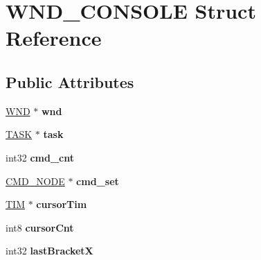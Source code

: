 \hypertarget{struct_w_n_d___c_o_n_s_o_l_e}{}\section{W\+N\+D\+\_\+\+C\+O\+N\+S\+O\+L\+E Struct Reference}
\label{struct_w_n_d___c_o_n_s_o_l_e}
\subsection*{Public Attributes}
\begin{DoxyCompactItemize}
\item 
\hypertarget{struct_w_n_d___c_o_n_s_o_l_e_a480ceb38881ea66056172bc95b153cfb}{}\hyperlink{struct_w_n_d}{W\+N\+D} $\ast$ {\bfseries wnd}\label{struct_w_n_d___c_o_n_s_o_l_e_a480ceb38881ea66056172bc95b153cfb}

\item 
\hypertarget{struct_w_n_d___c_o_n_s_o_l_e_a4b114b647ffdc3efed9cda84cb32c3f5}{}\hyperlink{struct_t_a_s_k}{T\+A\+S\+K} $\ast$ {\bfseries task}\label{struct_w_n_d___c_o_n_s_o_l_e_a4b114b647ffdc3efed9cda84cb32c3f5}

\item 
\hypertarget{struct_w_n_d___c_o_n_s_o_l_e_a544d111ece9d798069d05c1f7db47b51}{}int32 {\bfseries cmd\+\_\+cnt}\label{struct_w_n_d___c_o_n_s_o_l_e_a544d111ece9d798069d05c1f7db47b51}

\item 
\hypertarget{struct_w_n_d___c_o_n_s_o_l_e_a2e3d52b48303c1477242322433a03bbd}{}\hyperlink{struct_c_m_d___n_o_d_e}{C\+M\+D\+\_\+\+N\+O\+D\+E} $\ast$ {\bfseries cmd\+\_\+set}\label{struct_w_n_d___c_o_n_s_o_l_e_a2e3d52b48303c1477242322433a03bbd}

\item 
\hypertarget{struct_w_n_d___c_o_n_s_o_l_e_abcd76ef98471929968c10056d146edf6}{}\hyperlink{struct_t_i_m}{T\+I\+M} $\ast$ {\bfseries cursor\+Tim}\label{struct_w_n_d___c_o_n_s_o_l_e_abcd76ef98471929968c10056d146edf6}

\item 
\hypertarget{struct_w_n_d___c_o_n_s_o_l_e_a15ca8fc665f2f0d2e7b65cfffd96fa94}{}int8 {\bfseries cursor\+Cnt}\label{struct_w_n_d___c_o_n_s_o_l_e_a15ca8fc665f2f0d2e7b65cfffd96fa94}

\item 
\hypertarget{struct_w_n_d___c_o_n_s_o_l_e_ade1998288a28b59299ec67505fbf9872}{}int32 {\bfseries last\+Bracket\+X}\label{struct_w_n_d___c_o_n_s_o_l_e_ade1998288a28b59299ec67505fbf9872}


\end{DoxyCompactItemize}
